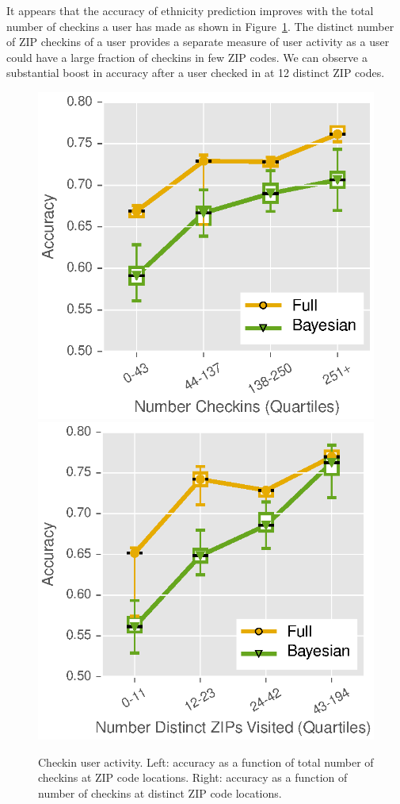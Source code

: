 It appears that the accuracy of ethnicity prediction improves with the total number of checkins a user has made as shown in Figure~\ref{fig:howmuchdata}. The distinct number of ZIP checkins of a user provides a separate measure of user activity as a user could have a large fraction of checkins in few ZIP codes. We can observe a substantial boost in accuracy after a user checked in at 12 distinct ZIP codes.

\begin{figure}[h!]
  \centering
  \includegraphics[width=0.49\linewidth]{fig/footprints/checkins_to_accuracy.eps}
  \includegraphics[width=0.49\linewidth]{fig/footprints/zips_to_accuracy.eps}
  \caption{Checkin user activity. Left: accuracy as a function of total number of checkins at ZIP code locations. Right: accuracy as a function of number of checkins at distinct ZIP code locations.}
    \label{fig:howmuchdata}
\end{figure}


